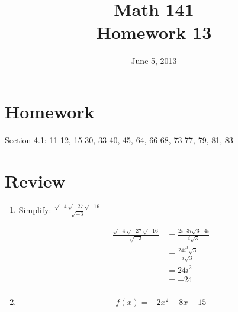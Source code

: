 \documentclass{exam}
\date{June 5, 2013}
\author{}
\title{Math 141 \\ Homework 13}
\begin{document}
  \maketitle

  \section{Homework}

  Section 4.1: 11-12, 15-30, 33-40, 45, 64, 66-68, 73-77, 79, 81, 83

  \section{Review}

  \begin{enumerate}
    \item Simplify: $\frac{\sqrt{-4}\sqrt{-27}\sqrt{-16}}{\sqrt{-3}}$
      \begin{solution}
        \begin{align*}
          \frac{\sqrt{-4}\sqrt{-27}\sqrt{-16}}{\sqrt{-3}} &= \frac{2i \cdot 3i \sqrt{3} \cdot 4i}{i \sqrt{3}} \\
          &= \frac{24i^3 \sqrt{3}}{i \sqrt{3}} \\
          &= 24 i^2 \\
          &= -24 \\
        \end{align*}
      \end{solution}

    \item
      \[
        f(x) = -2x^2 - 8x - 15
      \]


  \end{enumerate}
\end{document}
